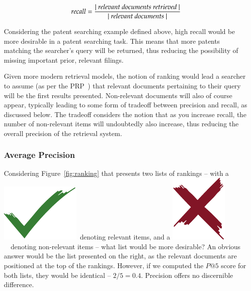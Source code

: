\begin{equation*}
recall = \frac{|~\text{\emph{relevant documents retrieved}}~|}{|~\text{\emph{relevant documents}}~|}
\end{equation*}

Considering the patent searching example defined above, high recall would be more desirable in a patent searching task. This means that more patents matching the searcher's query will be returned, thus reducing the possibility of missing important prior, relevant filings.

Given more modern retrieval models, the notion of ranking would lead a searcher to assume (as per the PRP~\citep{robertson1977prp}) that relevant documents pertaining to their query will be the first results presented. Non-relevant documents will also of course appear, typically leading to some form of tradeoff between precision and recall, as discussed below. The tradeoff considers the notion that as you increase recall, the number of non-relevant items will undoubtedly also increase, thus reducing the overall precision of the retrieval system.

\subsubsection{Average Precision}
Considering Figure~\ref{fig:ranking} that presents two lists of rankings -- with a~\includegraphics[height=\fontcharht\font`\d]{figures/ch0-tick.pdf}~denoting relevant items, and a \includegraphics[height=\fontcharht\font`\d]{figures/ch0-cross.pdf}~~denoting non-relevant items -- what list would be more desirable? An obvious answer would be the list presented on the right, as the relevant documents are positioned at the top of the rankings. However, if we computed the $P@5$ score for both lists, they would be identical -- $2/5 = 0.4$. Precision offers no discernible difference.

